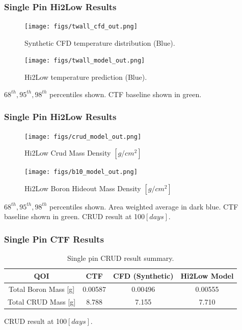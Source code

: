 \documentclass[t, pdftex]{beamer}
\begin{document}
\begin{frame}\frametitle{Single Pin Hi2Low Results}
    \begin{figure}
        \centering
        \begin{minipage}{.5\textwidth}
            \centering
            \texttt{[image: figs/twall\_cfd\_out.png]}
            \caption{Synthetic CFD temperature distribution (Blue).}
        \end{minipage}%
        \begin{minipage}{.5\textwidth}
            \centering
            \texttt{[image: figs/twall\_model\_out.png]}
            \caption{Hi2Low temperature prediction (Blue).}
        \end{minipage}
    \end{figure}
$68^{th}, 95^{th}, 98^{th}$ percentiles shown.
CTF baseline shown in green.
\end{frame}

\begin{frame}\frametitle{Single Pin Hi2Low Results}
    \begin{figure}
        \centering
        \begin{minipage}{.5\textwidth}
            \centering
            \texttt{[image: figs/crud\_model\_out.png]}
            \caption{Hi2Low Crud Mass Density $[g/cm^2]$}
        \end{minipage}%
        \begin{minipage}{.5\textwidth}
            \centering
            \texttt{[image: figs/b10\_model\_out.png]}
            \caption{Hi2Low Boron Hideout Mass Density $[g/cm^2]$}
        \end{minipage}
    \end{figure}
$68^{th}, 95^{th}, 98^{th}$ percentiles shown.
Area weighted average in dark blue.  CTF baseline shown in green.  CRUD result at 100$[days]$.
\end{frame}

\begin{frame}\frametitle{Single Pin CTF Results}
\begin{table}[h!]
\begin{center}
\begin{tabular}{|c|c|c|c|}
\hline 
 QOI  &   CTF	&  CFD (Synthetic)	& Hi2Low Model \\ \hline
Total Boron Mass [g]& 0.00587	&  0.00496	& 0.00555 \\
Total CRUD Mass [g]	& 8.788	&  7.155 & 7.710	\\
\hline
\end{tabular}
\caption{Single pin CRUD result summary.}
\label{tab:crud_res}
\end{center}
\end{table}
CRUD result at 100$[days]$.
\end{frame}
\end{document}

